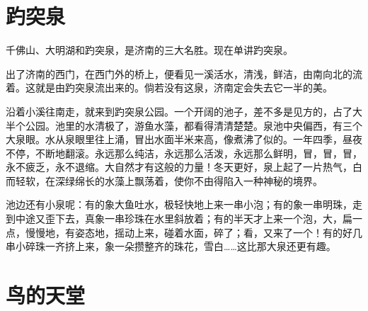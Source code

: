 \documentclass[12pt,UTF-8,openany]{ctexbook}
\begin{document}
\chapter{趵突泉}

\begin{Large}
    
    千佛山、大明湖和趵突泉，是济南的三大名胜。现在单讲趵突泉。
    
    出了济南的西门，在西门外的桥上，便看见一溪活水，清浅，鲜洁，由南向北的流着。这就是由趵突泉流出来的。倘若没有这泉，济南定会失去它一半的美。
    
    沿着小溪往南走，就来到趵突泉公园。一个开阔的池子，差不多是见方的，占了大半个公园。池里的水清极了，游鱼水藻，都看得清清楚楚。泉池中央偏西，有三个大泉眼。水从泉眼里往上涌，冒出水面半米来高，像煮沸了似的。一年四季，昼夜不停，不断地翻滚。永远那么纯洁，永远那么活泼，永远那么鲜明，冒，冒，冒，永不疲乏，永不退缩。大自然才有这般的力量！冬天更好，泉上起了一片热气，白而轻软，在深绿绵长的水藻上飘荡着，使你不由得陷入一种神秘的境界。
    
    池边还有小泉呢：有的象大鱼吐水，极轻快地上来一串小泡；有的象一串明珠，走到中途又歪下去，真象一串珍珠在水里斜放着；有的半天才上来一个泡，大，扁一点，慢慢地，有姿态地，摇动上来，碰着水面，碎了；看，又来了一个！有的好几串小碎珠一齐挤上来，象一朵攒整齐的珠花，雪白……这比那大泉还更有趣。
    
\end{Large}

\chapter{鸟的天堂}
\end{document}
